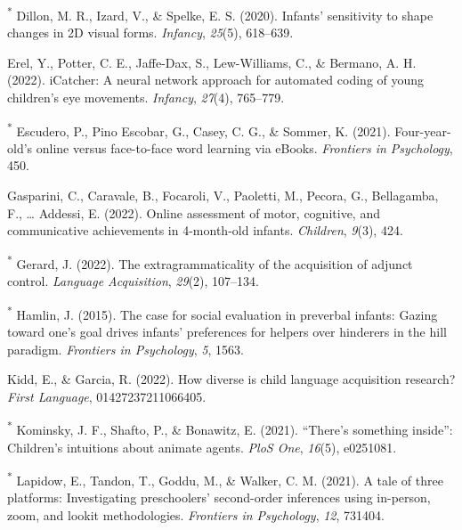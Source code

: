 \documentclass[
  man,floatsintext]{apa6}
\newlength{\cslhangindent}
\newlength{\cslentryspacingunit} %
\newenvironment{CSLReferences}[2] %
 {%
  \setlength{\parindent}{0pt}
  \ifodd #1
  \let\oldpar\par
  \def\par{\hangindent=\cslhangindent\oldpar}
  \fi
  \setlength{\parskip}{#2\cslentryspacingunit}
 }%
 {}
\begin{document}
\begin{CSLReferences}{1}{0}
\leavevmode{}%
\textsuperscript{*} Dillon, M. R., Izard, V., \& Spelke, E. S. (2020). Infants' sensitivity to shape changes in 2D visual forms. \emph{Infancy}, \emph{25}(5), 618--639.

\leavevmode{}%
Erel, Y., Potter, C. E., Jaffe-Dax, S., Lew-Williams, C., \& Bermano, A. H. (2022). iCatcher: A neural network approach for automated coding of young children's eye movements. \emph{Infancy}, \emph{27}(4), 765--779.

\leavevmode{}%
\textsuperscript{*} Escudero, P., Pino Escobar, G., Casey, C. G., \& Sommer, K. (2021). Four-year-old's online versus face-to-face word learning via eBooks. \emph{Frontiers in Psychology}, 450.

\leavevmode{}%
Gasparini, C., Caravale, B., Focaroli, V., Paoletti, M., Pecora, G., Bellagamba, F., \ldots{} Addessi, E. (2022). Online assessment of motor, cognitive, and communicative achievements in 4-month-old infants. \emph{Children}, \emph{9}(3), 424.

\leavevmode{}%
\textsuperscript{*} Gerard, J. (2022). The extragrammaticality of the acquisition of adjunct control. \emph{Language Acquisition}, \emph{29}(2), 107--134.

\leavevmode{}%
\textsuperscript{*} Hamlin, J. (2015). The case for social evaluation in preverbal infants: Gazing toward one's goal drives infants' preferences for helpers over hinderers in the hill paradigm. \emph{Frontiers in Psychology}, \emph{5}, 1563.

\leavevmode{}%
Kidd, E., \& Garcia, R. (2022). How diverse is child language acquisition research? \emph{First Language}, 01427237211066405.

\leavevmode{}%
\textsuperscript{*} Kominsky, J. F., Shafto, P., \& Bonawitz, E. (2021). {``There's something inside''}: Children's intuitions about animate agents. \emph{PloS One}, \emph{16}(5), e0251081.

\leavevmode{}%
\textsuperscript{*} Lapidow, E., Tandon, T., Goddu, M., \& Walker, C. M. (2021). A tale of three platforms: Investigating preschoolers' second-order inferences using in-person, zoom, and lookit methodologies. \emph{Frontiers in Psychology}, \emph{12}, 731404.


\end{CSLReferences}
\end{document}
